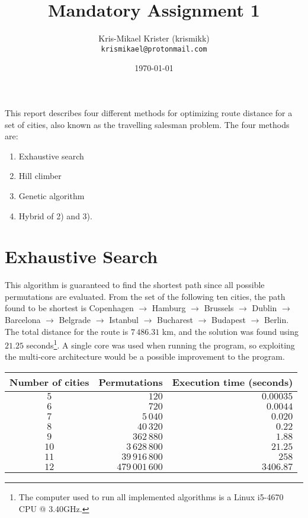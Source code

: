 \documentclass{article}
\title{Mandatory Assignment 1}
\author{Kris-Mikael Krister (krismikk)\\\texttt{krismikael@protonmail.com}}
\date{\today}
\begin{document}
\maketitle

\noindent This report describes four different methods for optimizing route distance for a set of cities, also known as the travelling salesman problem. The four methods are:

\begin{enumerate}
    \item Exhaustive search
    \item Hill climber
    \item Genetic algorithm
    \item Hybrid of 2) and 3).
\end{enumerate}

\section*{Exhaustive Search}

This algorithm is guaranteed to find the shortest path since all possible permutations are evaluated. From the set of the following ten cities, the path found to be shortest is Copenhagen $\rightarrow$ Hamburg $\rightarrow$ Brussels $\rightarrow$ Dublin $\rightarrow$ Barcelona $\rightarrow$ Belgrade $\rightarrow$ Istanbul $\rightarrow$ Bucharest $\rightarrow$ Budapest $\rightarrow$ Berlin. The total distance for the route is $7\,486.31$ km, and the solution was found using $21.25$ seconds\footnote{The computer used to run all implemented algorithms is a Linux i5-4670 CPU @ 3.40GHz.}. A single core was used when running the program, so exploiting the multi-core architecture would be a possible improvement to the program.  \\

\begin{center}
\begin{tabular}{crr}
\toprule
Number of cities & Permutations & Execution time (seconds)\\
\midrule
$5$ & $120$ & $0.00035$ \\
$6$ & $720$ & $0.0044$ \\
$7$ & $5\,040$ & $0.020$ \\
$8$ & $40\,320$ & $0.22$ \\
$9$ & $362\,880$ & $1.88$ \\
$10$ & $3\,628\,800$ & $21.25$ \\
$11$ & $39\,916\,800$ & $258$ \\
$12$ & $479\,001\,600$ & $3406.87$ \\
\bottomrule
\end{tabular}
\end{center}
\end{document}
